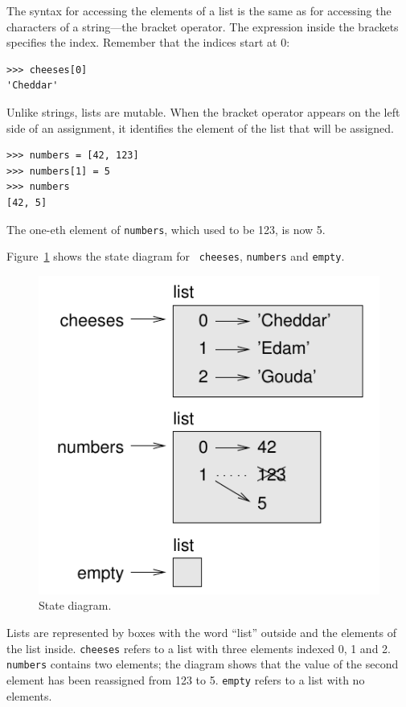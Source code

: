 \documentclass[10pt]{book}
\begin{document}
The syntax for accessing the elements of a list is the same as for
accessing the characters of a string---the bracket operator.  The
expression inside the brackets specifies the index.  Remember that the
indices start at 0:

\begin{verbatim}
>>> cheeses[0]
'Cheddar'
\end{verbatim}
%
Unlike strings, lists are mutable.  When the bracket operator appears
on the left side of an assignment, it identifies the element of the
list that will be assigned.

\begin{verbatim}
>>> numbers = [42, 123]
>>> numbers[1] = 5
>>> numbers
[42, 5]
\end{verbatim}
%
The one-eth element of {\tt numbers}, which
used to be 123, is now 5.

Figure~\ref{fig.liststate} shows 
the state diagram for {\tt
cheeses}, {\tt numbers} and {\tt empty}.

\begin{figure}
\centerline
{\includegraphics[scale=0.8]{figs/liststate.pdf}}
\caption{State diagram.}
\label{fig.liststate}
\end{figure}

Lists are represented by boxes with the word ``list'' outside
and the elements of the list inside.  {\tt cheeses} refers to
a list with three elements indexed 0, 1 and 2.
{\tt numbers} contains two elements; the diagram shows that the
value of the second element has been reassigned from 123 to 5.
{\tt empty} refers to a list with no elements.
\end{document}

